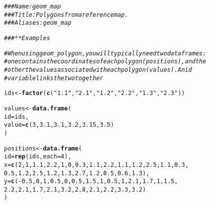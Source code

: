 \documentclass[a4paper,titlepage]{tufte-handout}\usepackage[]{graphicx}\usepackage[]{color}
\makeatletter
\newcommand{\hlnum}[1]{\textcolor[rgb]{0.686,0.059,0.569}{#1}}%
\newcommand{\hlstr}[1]{\textcolor[rgb]{0.192,0.494,0.8}{#1}}%
\newcommand{\hlcom}[1]{\textcolor[rgb]{0.678,0.584,0.686}{\textit{#1}}}%
\newcommand{\hlopt}[1]{\textcolor[rgb]{0,0,0}{#1}}%
\newcommand{\hlstd}[1]{\textcolor[rgb]{0.345,0.345,0.345}{#1}}%
\newcommand{\hlkwb}[1]{\textcolor[rgb]{0.69,0.353,0.396}{#1}}%
\newcommand{\hlkwc}[1]{\textcolor[rgb]{0.333,0.667,0.333}{#1}}%
\newcommand{\hlkwd}[1]{\textcolor[rgb]{0.737,0.353,0.396}{\textbf{#1}}}%
\newenvironment{kframe}{%
 \def\at@end@of@kframe{}%
 \ifinner\ifhmode%
  \def\at@end@of@kframe{\end{minipage}}%
  \begin{minipage}{\columnwidth}%
 \fi\fi%
 \def\FrameCommand##1{\hskip\@totalleftmargin \hskip-\fboxsep
 \colorbox{shadecolor}{##1}\hskip-\fboxsep
     \hskip-\linewidth \hskip-\@totalleftmargin \hskip\columnwidth}%
 \MakeFramed {\advance\hsize-\width
   \@totalleftmargin\z@ \linewidth\hsize
   \@setminipage}}%
 {\par\unskip\endMakeFramed%
 \at@end@of@kframe}
\newenvironment{knitrout}{}{} %
\makeatother
\begin{document}
\begin{knitrout}
\color{fgcolor}\begin{kframe}
\begin{alltt}
\hlcom{### Name: geom_map}
\hlcom{### Title: Polygons from a reference map.}
\hlcom{### Aliases: geom_map}

\hlcom{### ** Examples}

\hlcom{# When using geom_polygon, you will typically need two data frames:}
\hlcom{# one contains the coordinates of each polygon (positions),  and the}
\hlcom{# other the values associated with each polygon (values).  An id}
\hlcom{# variable links the two together}

\hlstd{ids} \hlkwb{<-} \hlkwd{factor}\hlstd{(}\hlkwd{c}\hlstd{(}\hlstr{"1.1"}\hlstd{,} \hlstr{"2.1"}\hlstd{,} \hlstr{"1.2"}\hlstd{,} \hlstr{"2.2"}\hlstd{,} \hlstr{"1.3"}\hlstd{,} \hlstr{"2.3"}\hlstd{))}

\hlstd{values} \hlkwb{<-} \hlkwd{data.frame}\hlstd{(}
  \hlkwc{id} \hlstd{= ids,}
  \hlkwc{value} \hlstd{=} \hlkwd{c}\hlstd{(}\hlnum{3}\hlstd{,} \hlnum{3.1}\hlstd{,} \hlnum{3.1}\hlstd{,} \hlnum{3.2}\hlstd{,} \hlnum{3.15}\hlstd{,} \hlnum{3.5}\hlstd{)}
\hlstd{)}

\hlstd{positions} \hlkwb{<-} \hlkwd{data.frame}\hlstd{(}
  \hlkwc{id} \hlstd{=} \hlkwd{rep}\hlstd{(ids,} \hlkwc{each} \hlstd{=} \hlnum{4}\hlstd{),}
  \hlkwc{x} \hlstd{=} \hlkwd{c}\hlstd{(}\hlnum{2}\hlstd{,} \hlnum{1}\hlstd{,} \hlnum{1.1}\hlstd{,} \hlnum{2.2}\hlstd{,} \hlnum{1}\hlstd{,} \hlnum{0}\hlstd{,} \hlnum{0.3}\hlstd{,} \hlnum{1.1}\hlstd{,} \hlnum{2.2}\hlstd{,} \hlnum{1.1}\hlstd{,} \hlnum{1.2}\hlstd{,} \hlnum{2.5}\hlstd{,} \hlnum{1.1}\hlstd{,} \hlnum{0.3}\hlstd{,}
  \hlnum{0.5}\hlstd{,} \hlnum{1.2}\hlstd{,} \hlnum{2.5}\hlstd{,} \hlnum{1.2}\hlstd{,} \hlnum{1.3}\hlstd{,} \hlnum{2.7}\hlstd{,} \hlnum{1.2}\hlstd{,} \hlnum{0.5}\hlstd{,} \hlnum{0.6}\hlstd{,} \hlnum{1.3}\hlstd{),}
  \hlkwc{y} \hlstd{=} \hlkwd{c}\hlstd{(}\hlopt{-}\hlnum{0.5}\hlstd{,} \hlnum{0}\hlstd{,} \hlnum{1}\hlstd{,} \hlnum{0.5}\hlstd{,} \hlnum{0}\hlstd{,} \hlnum{0.5}\hlstd{,} \hlnum{1.5}\hlstd{,} \hlnum{1}\hlstd{,} \hlnum{0.5}\hlstd{,} \hlnum{1}\hlstd{,} \hlnum{2.1}\hlstd{,} \hlnum{1.7}\hlstd{,} \hlnum{1}\hlstd{,} \hlnum{1.5}\hlstd{,}
  \hlnum{2.2}\hlstd{,} \hlnum{2.1}\hlstd{,} \hlnum{1.7}\hlstd{,} \hlnum{2.1}\hlstd{,} \hlnum{3.2}\hlstd{,} \hlnum{2.8}\hlstd{,} \hlnum{2.1}\hlstd{,} \hlnum{2.2}\hlstd{,} \hlnum{3.3}\hlstd{,} \hlnum{3.2}\hlstd{)}
\hlstd{)}


\end{alltt}
\end{kframe}
\end{knitrout}
\end{document}
